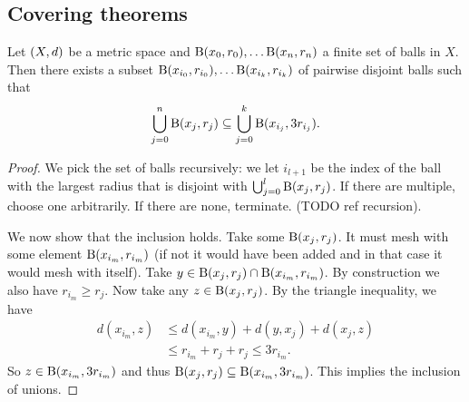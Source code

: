 \subsection{Covering theorems}
\begin{proposition}
Let $\left( X,d \right)$ be a metric space and $\operatorname{B}(x_0, r_0), \ldots \operatorname{B}(x_n, r_n)$ a finite set of balls in $X$. Then there exists a subset $\operatorname{B}(x_{i_0}, r_{i_0}), \ldots \operatorname{B}(x_{i_k}, r_{i_k})$ of pairwise disjoint balls such that
\[ \bigcup_{j=0}^n\operatorname{B}(x_j, r_j) \subseteq \bigcup_{j=0}^k \operatorname{B}(x_{i_j}, 3r_{i_j}). \]
\end{proposition}
\begin{proof}
We pick the set of balls recursively: we let $i_{l+1}$ be the index of the ball with the largest radius that is disjoint with $\bigcup_{j=0}^l \operatorname{B}(x_j, r_j)$. If there are multiple, choose one arbitrarily. If there are none, terminate. (TODO ref recursion).

We now show that the inclusion holds. Take some $\operatorname{B}(x_j, r_j)$. It must mesh with some element $\operatorname{B}(x_{i_m}, r_{i_m})$ (if not it would have been added and in that case it would mesh with itself). Take $y\in \operatorname{B}(x_j, r_j) \cap \operatorname{B}(x_{i_m}, r_{i_m})$. By construction we also have $r_{i_m} \geq r_j$. Now take any $z\in \operatorname{B}(x_j, r_j)$. By the triangle inequality, we have
\begin{align*}
d(x_{i_m}, z) &\leq d(x_{i_m}, y) + d(y, x_j) + d(x_j, z) \\
&\leq r_{i_m} + r_j + r_j \leq 3r_{i_m}.
\end{align*}
So $z\in \operatorname{B}(x_{i_m}, 3r_{i_m})$ and thus $\operatorname{B}(x_j, r_j)\subseteq\operatorname{B}(x_{i_m}, 3r_{i_m})$. This implies the inclusion of unions.
\end{proof}

